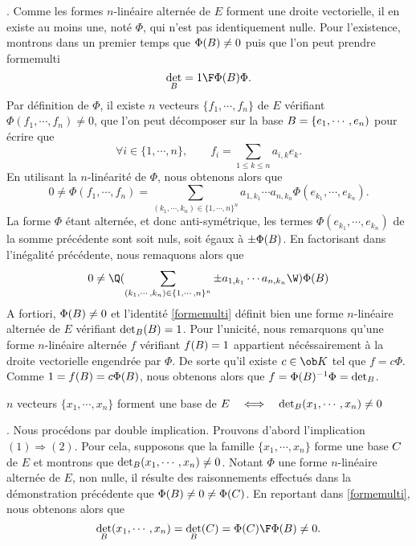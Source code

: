 \Demonstration. Comme les formes $n$-linéaire alternée de $E$ forment une droite vectorielle, il en existe au moins une, noté $\Phi$, qui n'est pas identiquement nulle. \pn
Pour l'existence, montrons dans un premier temps que $\Phi(\sc B)\neq0$ puis que l'on peut prendre 
\Equation [*] formemulti
$$
\det_{\sc B}={1\F \Phi(\sc B)}\Phi. 
$$ 
Par définition de $\Phi$, il existe $n$ vecteurs $\{f_1,\cdots, f_n\}$ de $E$ vérifiant $\Phi(f_1, \cdots, f_n)\neq0$, que l'on peut décomposer sur la base $\sc B=\{e_1, \cdots, e_n)$ pour écrire que 
$$
\forall i\in\{1,\cdots, n\}, \qquad f_i=\sum\limits_{1\le k\le n}a_{i,k}e_k.
$$
En utilisant la $n$-linéarité de $\Phi$, nous obtenons alors que 
$$
0\neq\Phi(f_1, \cdots, f_n)=\sum\limits_{(k_1,\cdots, k_n)\in\{1,\cdots, n\}^n}a_{1, k_1}\cdots a_{n,k_n}\Phi(e_{k_1}, \cdots, e_{k_n}).
$$
La forme $\Phi$ étant alternée, et donc anti-symétrique, les termes $\Phi(e_{k_1}, \cdots, e_{k_n})$ de la somme précédente sont soit nuls, soit égaux à $\pm\Phi(\sc B)$. 
En factorisant dans l'inégalité précédente, nous remaquons alors que 
$$
0\neq \Q(\sum\limits_{(k_1,\cdots, k_n)\in\{1,\cdots, n\}^n}\pm a_{1, k_1}\cdots a_{n,k_n}\W)\Phi(\sc B)
$$
A fortiori, $\Phi(\sc B)\neq0$ et l'identité \eqref{formemulti} définit bien une forme $n$-linéaire alternée de $E$ vérifiant $\det_{\sc B}(\sc B)=1$. \pn
Pour l'unicité, nous remarquons qu'une forme $n$-linéaire alternée $f$ vérifiant $f(\sc B)=1$ appartient nécéssairement à la droite vectorielle engendrée par $\Phi$. De sorte qu'il existe $c\in\ob K$ tel que $f=c\Phi$. Comme $1=f(\sc B)=c\Phi(\sc B)$, nous obtenons alors que $f=\Phi(\sc B)^{-1}\Phi=\det_{\sc B}$. 
\CQFD



$n$ vecteurs  $\{x_1, \cdots, x_n\}$ forment une base de $E \quad\Longleftrightarrow\quad \det_{\sc B}(x_1, \cdots, x_n)\neq0$

\Demonstration. Nous procédons par double implication. \smallskip
Prouvons d'abord l'implication $(1)\Rightarrow(2)$. Pour cela, supposons que la famille $\{x_1, \cdots, x_n\}$ forme une base $\sc C$ de $E$ et montrons que $\det_{\sc B}(x_1, \cdots, x_n)\neq0$. \pn
Notant $\Phi$ une forme $n$-linéaire alternée de $E$, non nulle, il résulte des raisonnements effectués dans la démonstration précédente que $\Phi(\sc B)\neq 0\neq\Phi(\sc C)$. En reportant dans \eqref{formemulti}, nous obtenons alors que 
$$
\det_{\sc B}(x_1, \cdots, x_n)=\det_{\sc B}(\sc C)={\Phi(\sc C)\F \Phi(\sc B)}\neq0.
$$

